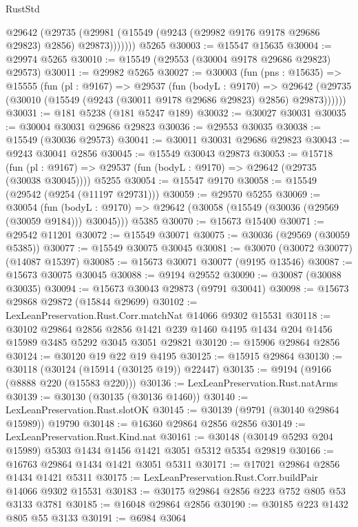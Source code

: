 \begin{lexlean}{RustStd}
\begin{coremodule}
          @29642
            (@29735 (@29981 (@15549 (@9243 (@29982 @9176 @9178 @29686 @29823) @2856) @29873)))))))
    @5265
@30003 := @15547 @15635
@30004 := @29974 @5265
@30010 := @15549 (@29553 (@30004 @9178 @29686 @29823) @29573)
@30011 := @29982 @5265
@30027 := @30003
    (fun (pns : @15635) =>
    @15555
      (fun (pl : @9167) =>
      @29537
        (fun (bodyL : @9170) =>
        @29642 (@29735 (@30010 (@15549 (@9243 (@30011 @9178 @29686 @29823) @2856) @29873))))))
@30031 := @181 @5238 (@181 @5247 @189)
@30032 := @30027 @30031
@30035 := @30004 @30031 @29686 @29823
@30036 := @29553 @30035
@30038 := @15549 (@30036 @29573)
@30041 := @30011 @30031 @29686 @29823
@30043 := @9243 @30041 @2856
@30045 := @15549 @30043 @29873
@30053 := @15718
    (fun (pl : @9167) => @29537 (fun (bodyL : @9170) => @29642 (@29735 (@30038 @30045))))
    @5255
@30054 := @15547 @9170
@30058 := @15549 (@29542 (@9254 (@11197 @29731)))
@30059 := @29570 @5255
@30069 := @30054
    (fun (bodyL : @9170) => @29642 (@30058 (@15549 (@30036 (@29569 (@30059 @9184))) @30045)))
    @5385
@30070 := @15673 @15400
@30071 := @29542 @11201
@30072 := @15549 @30071
@30075 := @30036 (@29569 (@30059 @5385))
@30077 := @15549 @30075 @30045
@30081 := @30070 (@30072 @30077) (@14087 @15397)
@30085 := @15673 @30071 @30077 (@9195 @13546)
@30087 := @15673 @30075 @30045
@30088 := @9194 @29552
@30090 := @30087 (@30088 @30035)
@30094 := @15673 @30043 @29873 (@9791 @30041)
@30098 := @15673 @29868 @29872 (@15844 @29699)
@30102 := LexLeanPreservation.Rust.Corr.matchNat @14066 @9302 @15531
@30118 := @30102
    @29864
    @2856
    @2856
    @1421
    @239
    @1460
    @4195
    @1434
    @204
    @1456
    @15989
    @3485
    @5292
    @3045
    @3051
    @29821
@30120 := @15906 @29864 @2856
@30124 := @30120 @19 @22 @19 @4195
@30125 := @15915 @29864
@30130 := @30118 (@30124 (@15914 (@30125 @19)) @22447)
@30135 := @9194 (@9166 (@8888 @220 (@15583 @220)))
@30136 := LexLeanPreservation.Rust.natArms
@30139 := @30130 (@30135 (@30136 @1460))
@30140 := LexLeanPreservation.Rust.slotOK
@30145 := @30139 (@9791 (@30140 @29864 @15989)) @19790
@30148 := @16360 @29864 @2856 @2856
@30149 := LexLeanPreservation.Rust.Kind.nat
@30161 := @30148 (@30149 @5293 @204 @15989) @5303 @1434 @1456 @1421 @3051 @5312 @5354 @29819
@30166 := @16763 @29864 @1434 @1421 @3051 @5311
@30171 := @17021 @29864 @2856 @1434 @1421 @5311
@30175 := LexLeanPreservation.Rust.Corr.buildPair @14066 @9302 @15531
@30183 := @30175 @29864 @2856 @223 @752 @805 @53 @3133 @3781
@30185 := @16048 @29864 @2856
@30190 := @30185 @223 @1432 @805 @55 @3133
@30191 := @6984 @3064

\end{coremodule}
\end{lexlean}
